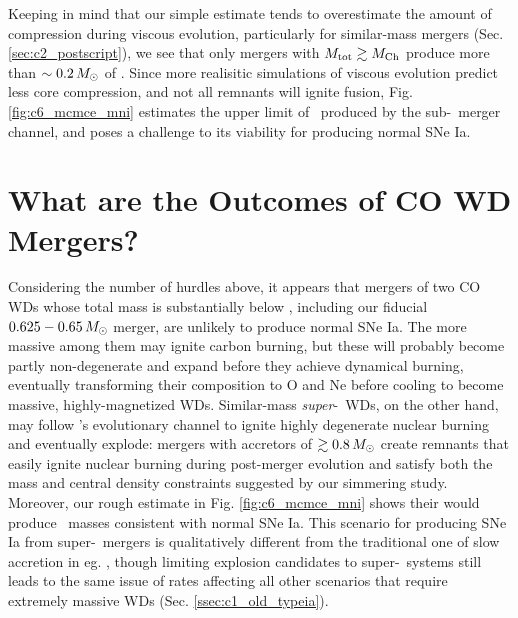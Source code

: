 Keeping in mind that our simple estimate tends to overestimate the amount of compression during viscous evolution, particularly for similar-mass mergers (Sec. \ref{sec:c2_postscript}), we see that only mergers with $\Mtot \gtrsim \Mch$ produce more than $\sim0.2\,\Msun$ of \Ni.  Since more realisitic simulations of viscous evolution predict less core compression, and not all remnants will ignite fusion, Fig. \ref{fig:c6_mcmce_mni} estimates the upper limit of \Ni\ produced by the sub-\Mch\ merger channel, and poses a challenge to its viability for producing normal SNe Ia.

\section{What are the Outcomes of CO WD Mergers?}

Considering the number of hurdles above, it appears that mergers of two CO WDs whose total mass is substantially below \Mch, including our fiducial $0.625 - 0.65\,\Msun$ merger, are unlikely to produce normal SNe Ia.  The more massive among them may ignite carbon burning, but these will probably become partly non-degenerate and expand before they achieve dynamical burning, eventually transforming their composition to O and Ne before cooling to become massive, highly-magnetized WDs.  Similar-mass \textit{super}-\Mch\ WDs, on the other hand, may follow \citeal{vkercj10}'s evolutionary channel to ignite highly degenerate nuclear burning and eventually explode: mergers with accretors of $\gtrsim0.8\,\Msun$ create remnants that easily ignite nuclear burning during post-merger evolution and satisfy both the mass and central density constraints suggested by our simmering study.  Moreover, our rough estimate in Fig. \ref{fig:c6_mcmce_mni} shows their would produce \Ni\ masses consistent with normal SNe Ia.  This scenario for producing SNe Ia from super-\Mch\ mergers is qualitatively different from the traditional one of slow accretion in eg. \cite{yoonpr07}, though limiting explosion candidates to super-\Mch\ systems still leads to the same issue of rates affecting all other scenarios that require extremely massive WDs (Sec. \ref{ssec:c1_old_typeia}).


